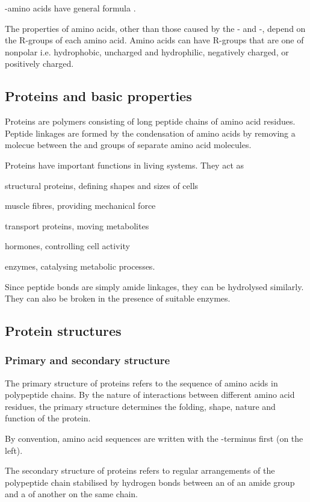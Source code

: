 \documentclass[Chemistry.tex]{subfiles}
\begin{document}
\mupalpha-amino acids have general formula .

The properties of amino acids, other than those caused by the \mupalpha- and \mupalpha-, depend on the R-groups of each amino acid. Amino acids can have R-groups that are one of nonpolar i.e. hydrophobic, uncharged and hydrophilic, negatively charged, or positively charged.
\subsection{Proteins and basic properties}
Proteins are polymers consisting of long peptide chains of amino acid residues. Peptide linkages are formed by the condensation of amino acids by removing a  molecue between the  and  groups of separate amino acid molecules.

Proteins have important functions in living systems. They act as \begin{slinenum}
\item structural proteins, defining shapes and sizes of cells
\item muscle fibres, providing mechanical force
\item transport proteins, moving metabolites
\item hormones, controlling cell activity
\item enzymes, catalysing metabolic processes.\end{slinenum}

Since peptide bonds are simply amide linkages, they can be hydrolysed similarly. They can also be broken in the presence of suitable enzymes.
\subsection{Protein structures}
\subsubsection{Primary and secondary structure}
The primary structure of proteins refers to the sequence of amino acids in polypeptide chains. By the nature of interactions between different amino acid residues, the primary structure determines the folding, shape, nature and function of the protein.

By convention, amino acid sequences are written with the -terminus first (on the left).

The secondary structure of proteins refers to regular arrangements of the polypeptide chain stabilised by hydrogen bonds between an  of an amide group and a  of another on the same chain.
\end{document}
